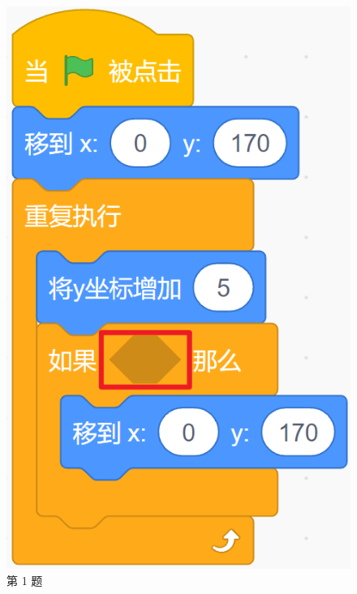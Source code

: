 \documentclass[10pt, a4paper]{article}
\begin{document}
\begin{enumerate}
\begin{figure}[htbp]
\begin{minipage}[t]{.35\textwidth}
\begin{minipage}[t]{.45\textwidth}
                    \includegraphics[width=\textwidth]{1-2.png}
                \end{minipage}
                \caption*{第 1 题}
            \end{minipage}
            \begin{minipage}[t]{.11\textwidth}
                \centering

\end{minipage}
\end{figure}
\end{enumerate}
\end{document}
